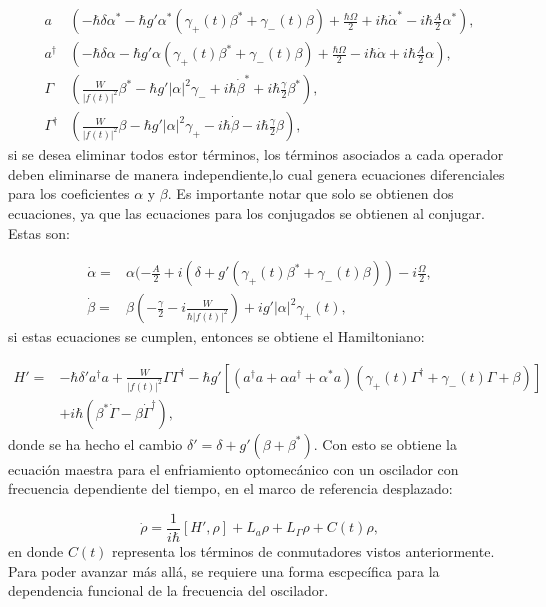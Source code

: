 \documentclass[a4paper,10pt]{report}
\begin{document}
\begin{align}
a&(-\hbar\delta\alpha^* -\hbar g' \alpha^*(\gamma_+(t) \beta^* + \gamma_-(t) \beta)+ \frac{\hbar\Omega}{2} + i\hbar\dot{\alpha}^* -i\hbar\frac{A}{2}\alpha^*),\\
a^\dagger&(-\hbar\delta\alpha -\hbar g' \alpha(\gamma_+(t) \beta^* + \gamma_-(t) \beta)+ \frac{\hbar\Omega}{2} - i\hbar\dot{\alpha} +i\hbar\frac{A}{2}\alpha),\\
\Gamma&(\frac{W}{|f(t)|^2}\beta^*-\hbar g'|\alpha|^2\gamma_- +  i\hbar\dot{\beta}^*+i\hbar\frac{\gamma}{2}\beta^*),\\
\Gamma^\dagger&(\frac{W}{|f(t)|^2}\beta-\hbar g'|\alpha|^2\gamma_+ -  i\hbar\dot{\beta}-i\hbar\frac{\gamma}{2}\beta),
\end{align} si se desea eliminar todos estor términos, los términos asociados a cada operador deben eliminarse de manera independiente,lo cual genera ecuaciones diferenciales para los coeficientes $\alpha$ y $\beta$. Es importante notar que solo se obtienen dos ecuaciones, ya que las ecuaciones para los conjugados se obtienen al conjugar. Estas son:

\begin{align}
\dot{\alpha} =& \alpha(-\frac{A}{2}+i(\delta+g'(\gamma_+(t) \beta^* + \gamma_-(t) \beta))-i\frac{\Omega}{2},\\
\dot{\beta} =& \beta(-\frac{\gamma}{2}-i\frac{W}{\hbar|f(t)|^2})+ig'|\alpha|^2\gamma_+(t),
\end{align} si estas ecuaciones se cumplen, entonces se obtiene el Hamiltoniano:


\begin{align*}
H'=& -\hbar \delta' a^\dagger a + \frac{W}{|f(t)|^2}\Gamma \Gamma^\dagger -\hbar g'[(a^{\dagger}a +\alpha a^{\dagger}+\alpha^* a)(\gamma_+(t)\Gamma^{\dagger}+\gamma_-(t)\Gamma+\beta)]\\
&+ i\hbar(\beta^*\dot{\Gamma} - \beta \dot{\Gamma}^\dagger),
\end{align*}  donde se ha hecho el cambio $\delta' = \delta + g'(\beta + \beta^*)$. Con esto se obtiene la ecuación maestra para el enfriamiento optomecánico con un oscilador con frecuencia dependiente del tiempo, en el marco de referencia desplazado:

\begin{equation}\label{DLCMasterEquation}
\dot{\rho} = \frac{1}{i\hbar}[H',\rho] + L_a\rho + L_\Gamma\rho + C(t)\rho,
\end{equation} en donde $C(t)$ representa los términos de conmutadores vistos anteriormente. Para poder avanzar más allá, se requiere una forma escpecífica para la dependencia funcional de la frecuencia del oscilador.
\end{document}
